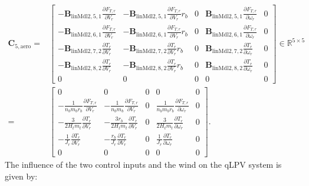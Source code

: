 \begin{align*}
\mathbf{C}_{5,\text{aero}} =& 
\begin{bmatrix}
    - \bm{B}_{\text{linMdl2}, 5, 1} \frac{\partial F_{T,r}}{\partial V_r} & - \bm{B}_{\text{linMdl2}, 5, 1} \frac{\partial F_{T,r}}{\partial V_r} r_b & 0 & \bm{B}_{\text{linMdl2}, 5, 1} \frac{\partial F_{T,r}}{\partial \omega_r} & 0\\
    - \bm{B}_{\text{linMdl2}, 6, 1} \frac{\partial F_{T,r}}{\partial V_r} & -\bm{B}_{\text{linMdl2}, 6, 1} \frac{\partial F_{T,r}}{\partial V_r} r_b & 0 & \bm{B}_{\text{linMdl2}, 6, 1} \frac{\partial F_{T,r}}{\partial \omega_r} & 0\\
    - \bm{B}_{\text{linMdl2}, 7, 2} \frac{\partial T_r}{\partial V_r} & -\bm{B}_{\text{linMdl2}, 7, 2} \frac{\partial T_r}{\partial V_r} r_b & 0 & \bm{B}_{\text{linMdl2}, 7, 2} \frac{\partial T_r}{\partial \omega_r} & 0\\
    -\bm{B}_{\text{linMdl2}, 8, 2} \frac{\partial T_r}{\partial V_r} & -\bm{B}_{\text{linMdl2}, 8, 2} \frac{\partial T_r}{\partial V_r} r_b & 0 & \bm{B}_{\text{linMdl2}, 8, 2} \frac{\partial T_r}{\partial \omega_r} & 0\\
    0 & 0 & 0 & 0 & 0
\end{bmatrix} \in \mathbb{R}^{5 \times 5}  \\
 =&
\begin{bmatrix}
    0 & 0 & 0 & 0 & 0 \\
    -\frac{1}{n_b m_b r_b} \frac{\partial F_{T,r}}{\partial V_r} & -\frac{1}{n_b m_b} \frac{\partial F_{T,r}}{\partial V_r} & 0 & \frac{1}{n_b m_b r_b} \frac{\partial F_{T,r}}{\partial \omega_r} & 0 \\
    -\frac{3}{2 H_t m_t} \frac{\partial T_r}{\partial V_r} & -\frac{3 r_b}{2 H_t m_t} \frac{\partial T_r}{\partial V_r} & 0 & \frac{3}{2 H_t m_t} \frac{\partial T_r}{\partial \omega_r} & 0 \\
    -\frac{1}{J_r} \frac{\partial T_r}{\partial V_r} & -\frac{r_b}{J_r} \frac{\partial T_r}{\partial V_r} & 0 & \frac{1}{J_r} \frac{\partial T_r}{\partial \omega_r} & 0 \\
    0 & 0 & 0 & 0 & 0
\end{bmatrix}.
\end{align*}
%
The influence of the two control inputs and the wind on the qLPV system is given by:
